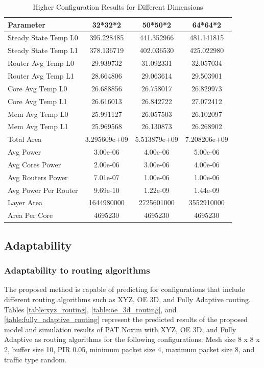 \documentclass[conference]{IEEEtran}
\begin{document}
\begin{table}[h!]
    \centering
    \begin{tabular}{|l|c|c|c|}
        \hline
        \textbf{Parameter} & \textbf{32*32*2} & \textbf{50*50*2} & \textbf{64*64*2} \\ \hline
        Steady State Temp L0 & 395.228485 & 441.352966 & 481.141815 \\ \hline
        Steady State Temp L1 & 378.136719 & 402.036530 & 425.022980 \\ \hline
        Router Avg Temp L0 & 29.939732 & 31.092331 & 32.057034 \\ \hline
        Router Avg Temp L1 & 28.664806 & 29.063614 & 29.503901 \\ \hline
        Core Avg Temp L0 & 26.688856 & 26.758017 & 26.829973 \\ \hline
        Core Avg Temp L1 & 26.616013 & 26.842722 & 27.072412 \\ \hline
        Mem Avg Temp L0 & 25.991127 & 26.057503 & 26.102097 \\ \hline
        Mem Avg Temp L1 & 25.969568 & 26.130873 & 26.268902 \\ \hline
        Total Area & 3.295609e+09 & 5.513879e+09 & 7.208206e+09 \\ \hline
        Avg Power & 3.00e-06 & 4.00e-06 & 5.00e-06 \\ \hline
        Avg Cores Power & 2.00e-06 & 3.00e-06 & 4.00e-06 \\ \hline
        Avg Routers Power & 7.01e-07 & 1.00e-06 & 1.00e-06 \\ \hline
        Avg Power Per Router & 9.69e-10 & 1.22e-09 & 1.44e-09 \\ \hline
        Layer Area & 1644980000 & 2725601000 & 3552910000 \\ \hline
        Area Per Core & 4695230 & 4695230 & 4695230 \\ \hline
    \end{tabular}
    \caption{Higher Configuration Results for Different Dimensions}
    \label{tab:higher_config_results}
\end{table}



\subsection{Adaptability}
	
	\subsubsection{Adaptability to routing algorithms}
	The proposed method is capable of predicting for configurations that include different routing algorithms such as XYZ, OE 3D, and Fully Adaptive routing. Tables \ref{table:xyz_routing}, \ref{table:oe_3d_routing}, and \ref{table:fully_adaptive_routing} represent the predicted results of the proposed model and simulation results of PAT Noxim with XYZ, OE 3D, and Fully Adaptive as routing algorithms for the following configurations: Mesh size 8 x 8 x 2, buffer size 10, PIR 0.05, minimum packet size 4, maximum packet size 8, and traffic type random.
	
\end{document}
